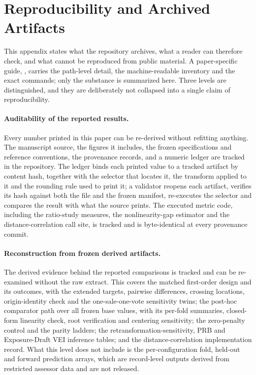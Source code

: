 \documentclass[10pt]{article}
\theoremstyle{definition}
\newcommand{\1}{\mathbf{1}}
\begin{document}
\section{Reproducibility and Archived Artifacts}
\label{app:ccao_results}

This appendix states what the repository archives, what a reader can therefore check, and what
cannot be reproduced from public material. A paper-specific guide, ,
carries the path-level detail, the machine-readable inventory and the exact commands; only the
substance is summarized here. Three levels are distinguished, and they are deliberately not
collapsed into a single claim of reproducibility.

\paragraph{Auditability of the reported results.} Every number printed in this paper can be
re-derived without refitting anything. The manuscript source, the figures it includes, the frozen
specifications and reference conventions, the provenance records, and a numeric ledger are tracked
in the repository. The ledger binds each printed value to a tracked artifact by content hash,
together with the selector that locates it, the transform applied to it and the rounding rule used
to print it; a validator reopens each artifact, verifies its hash against both the file and the
frozen manifest, re-executes the selector and compares the result with what the source prints. The
executed metric code, including the ratio-study measures, the nonlinearity-gap estimator and the
distance-correlation call site, is tracked and is byte-identical at every provenance commit.

\paragraph{Reconstruction from frozen derived artifacts.} The derived evidence behind the reported
comparisons is tracked and can be re-examined without the raw extract. This covers the matched
first-order design and its outcomes, with the extended targets, pairwise differences, crossing
locations, origin-identity check and the one-sale-one-vote sensitivity twins; the post-hoc
comparator path over all frozen base values, with its per-fold summaries, closed-form linearity
check, root verification and centering sensitivity; the zero-penalty control and the parity
ladders; the retransformation-sensitivity, PRB and Exposure-Draft VEI inference tables; and the
distance-correlation implementation record. What this level does not include is the
per-configuration fold, held-out and forward prediction arrays, which are record-level outputs
derived from restricted assessor data and are not released.
\end{document}

